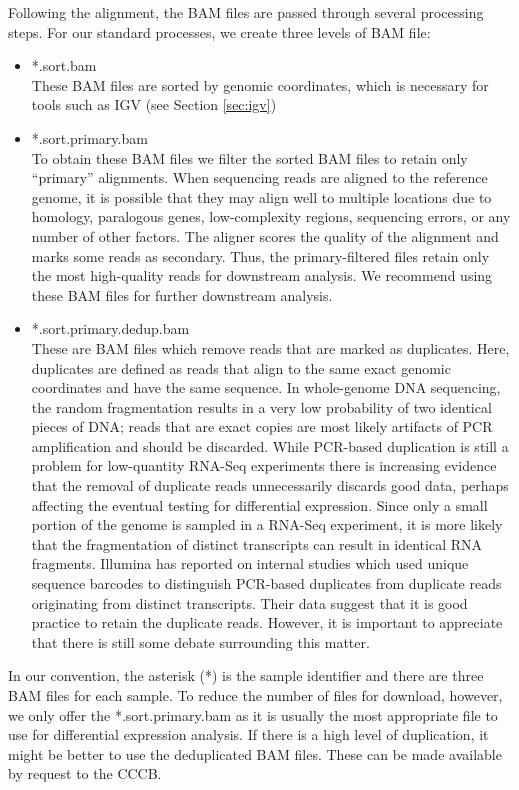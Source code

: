 \documentclass{article}
\begin{document}
Following the alignment, the BAM files are passed through several processing steps.  For our standard processes, we create three levels of BAM file:
\begin{itemize}
\item *.sort.bam \\
These BAM files are sorted by genomic coordinates, which is necessary for tools such as IGV (see Section \ref{sec:igv})
\item *.sort.primary.bam \\
To obtain these BAM files we filter the sorted BAM files to retain only ``primary'' alignments.  When sequencing reads are aligned to the reference genome, it is possible that they may align well to multiple locations due to homology, paralogous genes, low-complexity regions, sequencing errors, or any number of other factors.  The aligner scores the quality of the alignment and marks some reads as secondary.  Thus, the primary-filtered files retain only the most high-quality reads for downstream analysis.  We recommend using these BAM files for further downstream analysis.  
\item *.sort.primary.dedup.bam \\
These are BAM files which remove reads that are marked as duplicates.  Here, duplicates are defined as reads that align to the same exact genomic coordinates and have the same sequence.  In whole-genome DNA sequencing, the random fragmentation results in a very low probability of two identical pieces of DNA; reads that are exact copies are most likely artifacts of PCR amplification and should be discarded.  While PCR-based duplication is still a problem for low-quantity RNA-Seq experiments there is increasing evidence that the removal of duplicate reads unnecessarily discards good data, perhaps affecting the eventual testing for differential expression.  Since only a small portion of the genome is sampled in a RNA-Seq experiment, it is more likely that the fragmentation of distinct transcripts can result in identical RNA fragments.  Illumina has reported on internal studies which used unique sequence barcodes to distinguish PCR-based duplicates from duplicate reads originating from distinct transcripts.  Their data suggest that it is good practice to retain the duplicate reads.  However, it is important to appreciate that there is still some debate surrounding this matter.  
\end{itemize}

In our convention, the asterisk (*) is the sample identifier and there are three BAM files for each sample.  To reduce the number of files for download, however, we only offer the *.sort.primary.bam as it
is usually the most appropriate file to use for differential expression analysis.  If there is a high level of duplication, it might be better to use the deduplicated BAM files.  These can be made available by request to the CCCB.
\end{document}
